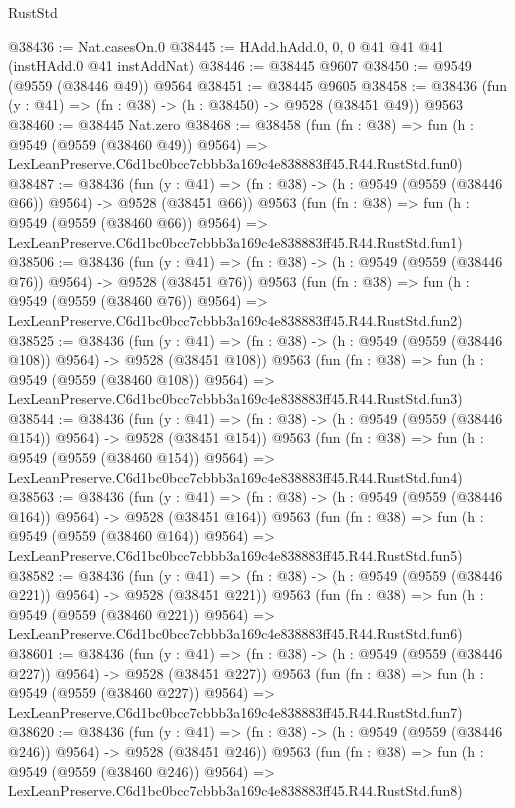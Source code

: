 \begin{lexlean}{RustStd}
\begin{coremodule}
@38436 := Nat.casesOn.{0}
@38445 := HAdd.hAdd.{0, 0, 0} @41 @41 @41 (instHAdd.{0} @41 instAddNat)
@38446 := @38445 @9607
@38450 := @9549 (@9559 (@38446 @49)) @9564
@38451 := @38445 @9605
@38458 := @38436 (fun (y : @41) => (fn : @38) -> (h : @38450) -> @9528 (@38451 @49)) @9563
@38460 := @38445 Nat.zero
@38468 := @38458
    (fun (fn : @38) =>
    fun (h : @9549 (@9559 (@38460 @49)) @9564) =>
    LexLeanPreserve.C6d1bc0bcc7cbbb3a169c4e838883ff45.R44.RustStd.fun0)
@38487 := @38436
    (fun (y : @41) => (fn : @38) -> (h : @9549 (@9559 (@38446 @66)) @9564) -> @9528 (@38451 @66))
    @9563
    (fun (fn : @38) =>
    fun (h : @9549 (@9559 (@38460 @66)) @9564) =>
    LexLeanPreserve.C6d1bc0bcc7cbbb3a169c4e838883ff45.R44.RustStd.fun1)
@38506 := @38436
    (fun (y : @41) => (fn : @38) -> (h : @9549 (@9559 (@38446 @76)) @9564) -> @9528 (@38451 @76))
    @9563
    (fun (fn : @38) =>
    fun (h : @9549 (@9559 (@38460 @76)) @9564) =>
    LexLeanPreserve.C6d1bc0bcc7cbbb3a169c4e838883ff45.R44.RustStd.fun2)
@38525 := @38436
    (fun (y : @41) => (fn : @38) -> (h : @9549 (@9559 (@38446 @108)) @9564) -> @9528 (@38451 @108))
    @9563
    (fun (fn : @38) =>
    fun (h : @9549 (@9559 (@38460 @108)) @9564) =>
    LexLeanPreserve.C6d1bc0bcc7cbbb3a169c4e838883ff45.R44.RustStd.fun3)
@38544 := @38436
    (fun (y : @41) => (fn : @38) -> (h : @9549 (@9559 (@38446 @154)) @9564) -> @9528 (@38451 @154))
    @9563
    (fun (fn : @38) =>
    fun (h : @9549 (@9559 (@38460 @154)) @9564) =>
    LexLeanPreserve.C6d1bc0bcc7cbbb3a169c4e838883ff45.R44.RustStd.fun4)
@38563 := @38436
    (fun (y : @41) => (fn : @38) -> (h : @9549 (@9559 (@38446 @164)) @9564) -> @9528 (@38451 @164))
    @9563
    (fun (fn : @38) =>
    fun (h : @9549 (@9559 (@38460 @164)) @9564) =>
    LexLeanPreserve.C6d1bc0bcc7cbbb3a169c4e838883ff45.R44.RustStd.fun5)
@38582 := @38436
    (fun (y : @41) => (fn : @38) -> (h : @9549 (@9559 (@38446 @221)) @9564) -> @9528 (@38451 @221))
    @9563
    (fun (fn : @38) =>
    fun (h : @9549 (@9559 (@38460 @221)) @9564) =>
    LexLeanPreserve.C6d1bc0bcc7cbbb3a169c4e838883ff45.R44.RustStd.fun6)
@38601 := @38436
    (fun (y : @41) => (fn : @38) -> (h : @9549 (@9559 (@38446 @227)) @9564) -> @9528 (@38451 @227))
    @9563
    (fun (fn : @38) =>
    fun (h : @9549 (@9559 (@38460 @227)) @9564) =>
    LexLeanPreserve.C6d1bc0bcc7cbbb3a169c4e838883ff45.R44.RustStd.fun7)
@38620 := @38436
    (fun (y : @41) => (fn : @38) -> (h : @9549 (@9559 (@38446 @246)) @9564) -> @9528 (@38451 @246))
    @9563
    (fun (fn : @38) =>
    fun (h : @9549 (@9559 (@38460 @246)) @9564) =>
    LexLeanPreserve.C6d1bc0bcc7cbbb3a169c4e838883ff45.R44.RustStd.fun8)

\end{coremodule}
\end{lexlean}
